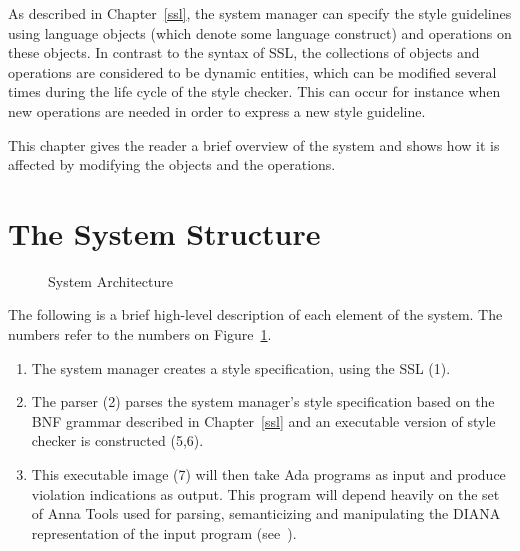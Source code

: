 As described in Chapter~\ref{ssl}, the
system manager can specify the style guidelines using language objects
(which denote some language construct) and operations on these objects.
In contrast to the syntax of SSL, the collections of 
objects and operations are considered to be dynamic entities, which can
be modified several times during the life cycle of the style checker. This can
occur for instance
when new operations are needed in order to express a new style guideline.

This chapter gives the reader a brief overview of the system
and shows how it is affected by modifying the objects and the operations.

\section{The System Structure}
	
\begin{figure}[htbp]

\vspace{4.1in}


\caption{System Architecture}\label{System}

\end{figure}

The following is a brief high-level description of each element of the system.
The numbers refer to the numbers on Figure~\ref{System}.

\begin{enumerate}

\item
The system manager creates a style specification, using the SSL (1).

\item
The parser (2) parses the system manager's style specification based on the 
BNF grammar described in Chapter~\ref{ssl} and an executable version of style
checker is constructed (5,6).


\item
This executable image (7) will then take Ada programs as input and 
produce violation indications as output.
This program will depend heavily on the set of Anna Tools used for parsing,
semanticizing and manipulating the DIANA representation of the input program
(see~\cite{evans:diana-lrm}).

\end{enumerate}


